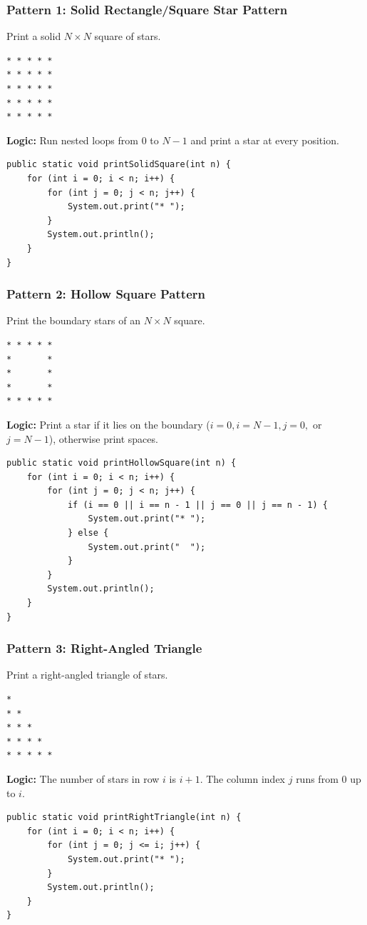 \documentclass[12pt,a4paper,oneside]{book}
\begin{document}
\subsubsection{Pattern 1: Solid Rectangle/Square Star Pattern}
Print a solid $N \times N$ square of stars.
\begin{lstlisting}[frame=single]
* * * * *
* * * * *
* * * * *
* * * * *
* * * * *
\end{lstlisting}
\textbf{Logic:} Run nested loops from $0$ to $N-1$ and print a star at every position.
\begin{lstlisting}[caption={Solid Square Pattern}]
public static void printSolidSquare(int n) {
    for (int i = 0; i < n; i++) {
        for (int j = 0; j < n; j++) {
            System.out.print("* ");
        }
        System.out.println();
    }
}
\end{lstlisting}

\subsubsection{Pattern 2: Hollow Square Pattern}
Print the boundary stars of an $N \times N$ square.
\begin{lstlisting}[frame=single]
* * * * *
*       *
*       *
*       *
* * * * *
\end{lstlisting}
\textbf{Logic:} Print a star if it lies on the boundary ($i=0, i=N-1, j=0,$ or $j=N-1$), otherwise print spaces.
\begin{lstlisting}[caption={Hollow Square Pattern}]
public static void printHollowSquare(int n) {
    for (int i = 0; i < n; i++) {
        for (int j = 0; j < n; j++) {
            if (i == 0 || i == n - 1 || j == 0 || j == n - 1) {
                System.out.print("* ");
            } else {
                System.out.print("  ");
            }
        }
        System.out.println();
    }
}
\end{lstlisting}

\subsubsection{Pattern 3: Right-Angled Triangle}
Print a right-angled triangle of stars.
\begin{lstlisting}[frame=single]
*
* *
* * *
* * * *
* * * * *
\end{lstlisting}
\textbf{Logic:} The number of stars in row $i$ is $i+1$. The column index $j$ runs from $0$ up to $i$.
\begin{lstlisting}[caption={Right-Angled Triangle}]
public static void printRightTriangle(int n) {
    for (int i = 0; i < n; i++) {
        for (int j = 0; j <= i; j++) {
            System.out.print("* ");
        }
        System.out.println();
    }
}
\end{lstlisting}
\end{document}
